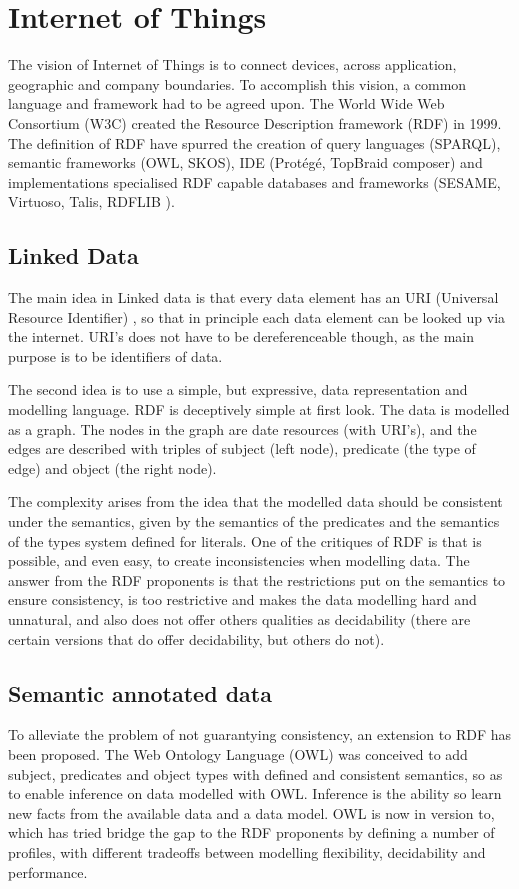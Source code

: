 \section{Internet of Things}\label{IoT}
The vision of Internet of Things is to connect devices, across application, geographic and company boundaries. To accomplish this vision, a common language and framework had to be agreed upon. The World Wide Web Consortium (W3C) created the Resource Description framework (RDF) in 1999. The definition of RDF have spurred the creation of query languages (SPARQL), semantic frameworks (OWL, SKOS), IDE (Prot\'eg\'e, TopBraid composer) and implementations specialised RDF capable databases and frameworks (SESAME, Virtuoso, Talis, RDFLIB ).



\subsection{Linked Data}
The main idea in Linked data is that every data element has an URI (Universal Resource Identifier) \cite{rfc23961998uniform}, so that in principle each data element can be looked up via the internet. URI's does not have to be dereferenceable though, as the main purpose is to be identifiers of data. 

The second idea is to use a simple, but expressive, data representation and modelling language. RDF is deceptively simple at first look. The data is modelled as a graph. The nodes in the graph are date resources (with URI's), and the edges are described with triples of subject (left node), predicate (the type of edge) and object (the right node).

The complexity arises from the idea that the modelled data should be consistent under the semantics, given by the semantics of the predicates and the semantics of the types system defined for literals. One of the critiques of RDF is that is possible, and even easy, to create inconsistencies when modelling data. The answer from the RDF proponents is that the restrictions put on the semantics to ensure consistency, is too restrictive and makes the data modelling hard and unnatural, and also does not offer others qualities as decidability (there are certain versions that do offer decidability, but others do not).	

\subsection{Semantic annotated data}
To alleviate the problem of not guarantying consistency, an extension to RDF has been proposed. The Web Ontology Language (OWL) was conceived to add subject, predicates and object types with defined and consistent semantics, so as to enable inference on data modelled with OWL. Inference is the ability so learn new facts from the available data and a data model. OWL is now in version to, which has tried bridge the gap to the RDF proponents by defining a number of profiles, with different tradeoffs between modelling flexibility, decidability and performance.	

